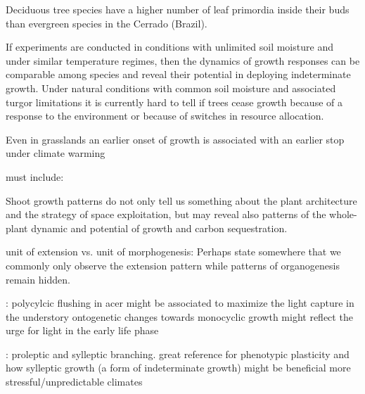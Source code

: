 \documentclass{article}
\begin{document}
Deciduous tree species have a higher number of leaf primordia inside their buds than evergreen species in the Cerrado (Brazil). 
	
If experiments are conducted in conditions with unlimited soil moisture and under similar temperature regimes, then the dynamics of growth responses can be comparable among species and reveal their potential in deploying indeterminate growth. Under natural conditions with common soil moisture and associated turgor limitations it is currently hard to tell if trees cease growth because of a response to the environment or because of switches in resource allocation. 
 
 Even in grasslands an earlier onset of growth is associated with an earlier stop under climate warming \cite{mohlGrowthAlpineGrassland2022a}
	
	
	must include: 
	
	\cite{iwasaOptimalGrowthSchedule1989}
	
	
	
	Shoot growth patterns do not only tell us something about the plant architecture and the strategy of space exploitation, but may reveal also patterns of the whole-plant dynamic and potential of growth and carbon sequestration.
	
	unit of extension vs. unit of morphogenesis: Perhaps state somewhere that we commonly only observe the extension pattern while patterns of organogenesis remain hidden. 
	
	\citep{verduEvolutionaryCorrelationsPolycyclic2007}: polycylcic flushing in acer might be associated to maximize the light capture in the understory
	ontogenetic changes towards monocyclic growth might reflect the urge for light in the early life phase
	
	 \citep{wuPhenotypicPlasticitySylleptic2001}: proleptic and sylleptic branching. great reference for phenotypic plasticity and how sylleptic growth (a form of indeterminate growth) might be beneficial more stressful/unpredictable climates
	
	\newpage
	
	
	
	
	
	
\end{document}

